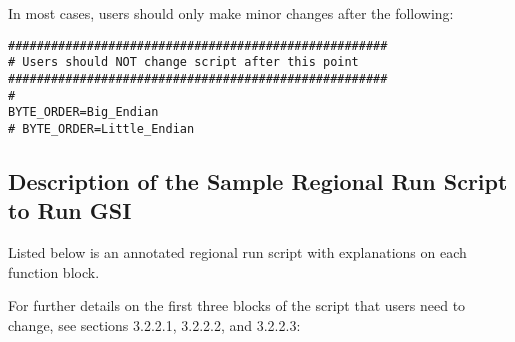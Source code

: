 In most cases, users should only make minor changes after the following:

\begin{footnotesize}
\begin{verbatim}
#####################################################
# Users should NOT change script after this point
#####################################################
#
BYTE_ORDER=Big_Endian
# BYTE_ORDER=Little_Endian
\end{verbatim}
\end{footnotesize}


\subsection{Description of the Sample Regional Run Script to Run GSI}
\label{sec3.2.3}

Listed below is an annotated regional run script with explanations on each function block.

For further details on the first three blocks of the script that users need to change, see sections 3.2.2.1, 3.2.2.2, and 3.2.2.3: 

